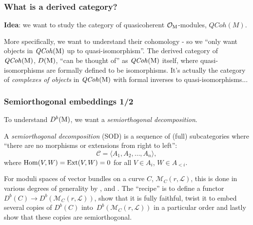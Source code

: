 \documentclass{beamer}
\begin{document}
\begin{frame}
    \frametitle{What is a derived category?}
\textbf{Idea}: we want to study the category of
quasicoherent $\mathcal{O}_{\operatorname{M}}$-modules, $\mathit{QCoh}(M)$.

More specifically, we want to understand their cohomology -
so we ``only want objects in $\mathit{QCoh}(\operatorname{M})$ up to quasi-isomorphism''. \pause
\vfill
The derived category of $\mathit{QCoh}(\operatorname{M})$, $D(\operatorname{M})$,
``can be thought of'' as $\mathit{QCoh}(\operatorname{M})$ itself, where quasi-isomorphisms are
formally defined to be isomorphisms. \pause
\vfill
\small{It's actually the category of \emph{complexes of objects} in $\mathit{QCoh}(\operatorname{M})$
with formal inverses to quasi-isomorphisms...}

\end{frame}
\begin{frame}
    \frametitle{Semiorthogonal embeddings 1/2}
To understand $D^b(\operatorname{M})$, we want a \emph{semiorthogonal decomposition}.

\begin{definition}
A \emph{semiorthogonal decomposition} (SOD) is a sequence of (full) subcategories
where ``there are no morphisms or extensions from right to left'':
\[
   \mathcal{C} = \langle A_1, A_2, \dots, A_n \rangle,
\]
where $\operatorname{Hom}(V, W) = \operatorname{Ext}(V, W) = 0$ for all $V \in A_i$, $W \in A_{< i}$.
\end{definition}\pause

For moduli spaces of vector bundles on a curve $C$,
$\mathcal{M}_{C}(r, \mathcal{L})$, this is done in various degrees of generality by
\cite{MR3713871, MR3880395, MR3764066}, \cite{MR3954042} and \cite{MR4651618}.
The ``recipe'' is to define a functor $D^b(C) \to D^b(\mathcal{M}_C(r, \mathcal{L}))$,
show that it is fully faithful, twist it to embed several copies of $D^b(C)$
into~$D^b(\mathcal{M}_{C}(r, \mathcal{L}))$ in a particular order and lastly show
that these copies are semiorthogonal.

\end{frame}
\end{document}
